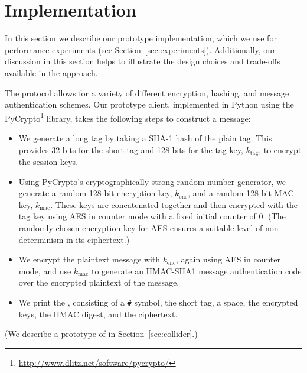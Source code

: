 \section{Implementation}
\label{sec:implementation}

In this section we describe our prototype \hoot implementation, which we
use for performance experiments (see
Section~\ref{sec:experiments}). Additionally, our discussion in this
section helps to illustrate the design choices and trade-offs available
in the \hoot approach.

The \hoot protocol allows for a variety of different encryption,
hashing, and message authentication schemes. Our prototype client,
implemented in Python using the PyCrypto\footnote{\url{http://www.dlitz.net/software/pycrypto/}} library, takes the following steps to construct a message:
\begin{itemize}
\item We generate a long tag by taking a SHA-1 hash of the plain
  tag. This provides 32 bits for the short tag and 128 bits for the
 tag key, $k_{\mathrm{tag}}$, to encrypt the session keys.
\item Using PyCrypto's cryptographically-strong random number
  generator, we generate 
  a random 128-bit encryption key, $k_{\mathrm{enc}}$, and a random 128-bit MAC key,
  $k_{\mathrm{mac}}$. These keys are
  concatenated together and then encrypted with the tag key using AES in
  counter mode with a fixed initial counter of $0$. (The randomly
  chosen encryption key for AES ensures a suitable level of
  non-determinism in its ciphertext.)
\item We encrypt the plaintext message with $k_{\mathrm{enc}}$, again using AES in
  counter mode, and use $k_{\mathrm{mac}}$ to generate an HMAC-SHA1
  message authentication code over the encrypted plaintext of the
  message.
\item We print the \hoot, consisting of a {\tt \#} symbol, the short tag,
  a space, the encrypted keys, the HMAC digest, and the ciphertext.
\end{itemize}

(We describe a prototype of  in
Section~\ref{sec:collider}.)

